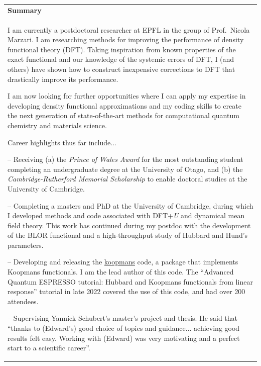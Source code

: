 \documentclass[10pt,a4paper,final]{article}
\begin{document}
\begin{tabularx}{\textwidth}{X}
   \cellcolor{seaborn_blue}\large\textbf{\textcolor{seaborn_bg_grey_half}{Summary}} \\
   I am currently a postdoctoral researcher at EPFL in the group of Prof.\ Nicola Marzari. I am researching methods for improving the performance of density functional theory (DFT). Taking inspiration from known properties of the exact functional and our knowledge of the systemic errors of DFT, I (and others) have shown how to construct inexpensive corrections to DFT that drastically improve its performance.

   \vspace{6pt}
   I am now looking for further opportunities where I can apply my expertise in developing density functional approximations and my coding skills to create the next generation of state-of-the-art methods for computational quantum chemistry and materials science.
   
   \vspace{6pt}
   Career highlights thus far include...
   \vspace{6pt}

   -- Receiving (a) the \textit{Prince of Wales Award} for the most outstanding student completing an undergraduate degree at the University of Otago, and (b) the \textit{Cambridge-Rutherford Memorial Scholarship} to enable doctoral studies at the University of Cambridge.
   \vspace{6pt}

   -- Completing a masters and PhD at the University of Cambridge, during which I developed methods and code associated with DFT+\emph{U} and dynamical mean field theory.
    This work has continued during my postdoc with the development of the BLOR functional and a high-throughput study of Hubbard and Hund's parameters.
   \vspace{6pt}

   -- Developing and releasing the \href{https://koopmans-functionals.org/}{koopmans} code, a package that implements Koopmans functionals. I am the lead author of this code. The ``Advanced Quantum ESPRESSO tutorial: Hubbard and Koopmans functionals from linear response'' tutorial in late 2022 covered the use of this code, and had over 200 attendees. %
   \vspace{6pt}

   -- Supervising Yannick Schubert's master's project and thesis. He said that ``thanks to (Edward's) good choice of topics and guidance... achieving good results felt easy. Working with (Edward) was very motivating and a perfect start to a scientific career''.
   \vspace{6pt}
\end{tabularx}%
\setlength{\fboxsep}{5pt}%
\setlength{\fboxrule}{0pt}%
\end{document}
